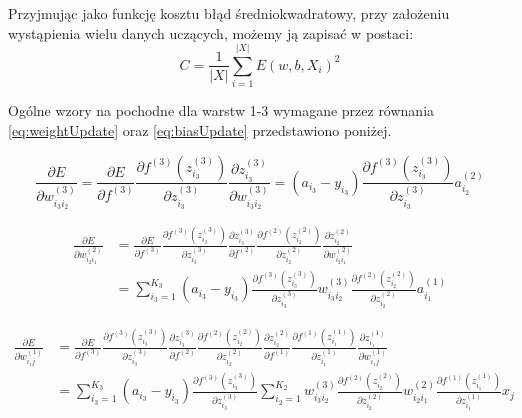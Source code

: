 \documentclass[12pt,twoside]{article}
\begin{document}
Przyjmując jako funkcję kosztu błąd średniokwadratowy, przy założeniu wystąpienia wielu danych uczących, możemy \cite{nndl} ją zapisać w postaci:
\begin{equation}
	C = \frac{1}{|X|} \sum_{i=1}^{|X|} E(w, b, X_i)^2
\end{equation}

Ogólne wzory na pochodne dla warstw 1-3 wymagane przez równania \ref{eq:weightUpdate} oraz \ref{eq:biasUpdate} przedstawiono poniżej.\cite{kiaMultiLayer}

\begin{equation}
	\frac{\partial E}{\partial w_{i_3 i_2}^{(3)}} =
	\frac{\partial E}{\partial f^{(3)}}
	\frac{\partial f^{(3)} \left( z_{i_3}^{(3)} \right)}{\partial z_{i_3}^{(3)}}
	\frac{\partial z_{i_3}^{(3)} }{\partial w_{i_3 i_2}^{(3)}}
	=
	\left(a_{i_3} - y_{i_3} \right)
	\frac{\partial f^{(3)} \left( z_{i_3}^{(3)} \right)}{\partial z_{i_3}^{(3)}}
	a_{i_2}^{(2)}
\end{equation}

\begin{equation}
	\begin{aligned}
		\frac{\partial E}{\partial w_{i_2 i_1}^{(2)}} &=
		\frac{\partial E}{\partial f^{(3)}}
		\frac{\partial f^{(3)} \left( z_{i_3}^{(3)} \right)}{\partial z_{i_3}^{(3)}}
		\frac{\partial z_{i_3}^{(3)} }{\partial f^{(2)}}
		\frac{\partial f^{(2)} \left( z_{i_2}^{(2)} \right)}{\partial z_{i_2}^{(2)}}
		\frac{\partial z_{i_2}^{(2)} }{\partial w_{i_2 i_1}^{(2)}}
		\\&=
		\sum_{i_3 = 1}^{K_3}
		\left(a_{i_3} - y_{i_3} \right)
		\frac{\partial f^{(3)} \left( z_{i_3}^{(3)} \right)}{\partial z_{i_3}^{(3)}}
		w_{i_3 i_2}^{(3)}
		\frac{\partial f^{(2)} \left( z_{i_2}^{(2)} \right)}{\partial z_{i_2}^{(2)}}
		a_{i_1}^{(1)}
	\end{aligned}
\end{equation}

\begin{equation}
	\begin{aligned}
		\frac{\partial E}{\partial w_{i_1 j}^{(1)}} &=
		\frac{\partial E}{\partial f^{(3)}}
		\frac{\partial f^{(3)} \left( z_{i_3}^{(3)} \right)}{\partial z_{i_3}^{(3)}}
		\frac{\partial z_{i_3}^{(3)} }{\partial f^{(2)}}
		\frac{\partial f^{(2)} \left( z_{i_2}^{(2)} \right)}{\partial z_{i_2}^{(2)}}
		\frac{\partial z_{i_2}^{(2)} }{\partial f^{(1)}}
		\frac{\partial f^{(1)} \left( z_{i_1}^{(1)} \right)}{\partial z_{i_1}^{(1)}}
		\frac{\partial z_{i_1}^{(1)} }{\partial w_{i_1 j}^{(1)}}
		\\&=
		\sum_{i_3 = 1}^{K_3}
		\left(a_{i_3} - y_{i_3} \right)
		\frac{\partial f^{(3)} \left( z_{i_3}^{(3)} \right)}{\partial z_{i_3}^{(3)}}
		\sum_{i_2 = 1}^{K_2}
		w_{i_3 i_2}^{(3)}
		\frac{\partial f^{(2)} \left( z_{i_2}^{(2)} \right)}{\partial z_{i_2}^{(2)}}
		w_{i_2 i_1}^{(2)}
		\frac{\partial f^{(1)} \left( z_{i_1}^{(1)} \right)}{\partial z_{i_1}^{(1)}}
		x_j
	\end{aligned}
\end{equation}
\end{document}
